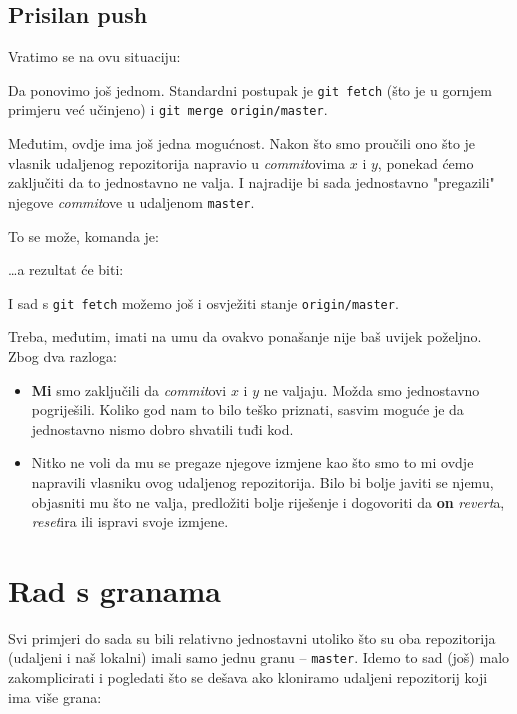 \subsection*{Prisilan push}

Vratimo se na ovu situaciju:



Da ponovimo još jednom.
Standardni postupak je \verb+git fetch+ (što je u gornjem primjeru već učinjeno) i \verb+git merge origin/master+.

Međutim, ovdje ima još jedna mogućnost.
Nakon što smo proučili ono što je vlasnik udaljenog repozitorija napravio u \emph{commit}ovima $x$ i $y$, ponekad ćemo zaključiti da to jednostavno ne valja. 
I najradije bi sada jednostavno "pregazili" njegove \emph{commit}ove u udaljenom \verb+master+.

To se može, komanda je:


\dots{}a rezultat će biti:



I sad s \verb+git fetch+ možemo još i osvježiti stanje \verb+origin/master+.

Treba, međutim, imati na umu da ovakvo ponašanje nije baš uvijek poželjno. 
Zbog dva razloga:

\begin{itemize}
	\item \textbf{Mi} smo zaključili da \emph{commit}ovi $x$ i $y$ ne valjaju. Možda smo jednostavno pogriješili. Koliko god nam to bilo teško priznati, sasvim moguće je da jednostavno nismo dobro shvatili tuđi kod.
	\item Nitko ne voli da mu se pregaze njegove izmjene kao što smo to mi ovdje napravili vlasniku ovog udaljenog repozitorija. Bilo bi bolje javiti se njemu, objasniti mu što ne valja, predložiti bolje riješenje i dogovoriti da \textbf{on} \emph{revert}a, \emph{reset}ira ili ispravi svoje izmjene.
\end{itemize}

\section*{Rad s granama}

Svi primjeri do sada su bili relativno jednostavni utoliko što su oba repozitorija (udaljeni i naš lokalni) imali samo jednu granu -- \verb+master+.
Idemo to sad (još) malo zakomplicirati i pogledati što se dešava ako kloniramo udaljeni repozitorij koji ima više grana:

